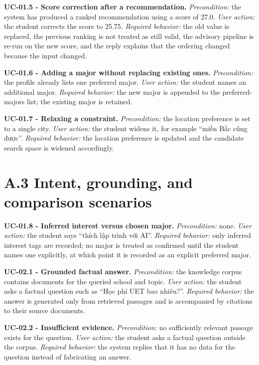 \documentclass[../main.tex]{subfiles}
\begin{document}
\textbf{UC-01.5 - Score correction after a recommendation.}
\textit{Precondition:} the system has produced a ranked recommendation using a score of 27.0.
\textit{User action:} the student corrects the score to 25.75.
\textit{Required behavior:} the old value is replaced, the previous ranking is not treated as still valid, the advisory pipeline is re-run on the new score, and the reply explains that the ordering changed because the input changed.

\textbf{UC-01.6 - Adding a major without replacing existing ones.}
\textit{Precondition:} the profile already lists one preferred major.
\textit{User action:} the student names an additional major.
\textit{Required behavior:} the new major is appended to the preferred-majors list; the existing major is retained.

\textbf{UC-01.7 - Relaxing a constraint.}
\textit{Precondition:} the location preference is set to a single city.
\textit{User action:} the student widens it, for example ``miền Bắc cũng được''.
\textit{Required behavior:} the location preference is updated and the candidate search space is widened accordingly.

\section*{A.3 Intent, grounding, and comparison scenarios}

\textbf{UC-01.8 - Inferred interest versus chosen major.}
\textit{Precondition:} none.
\textit{User action:} the student says ``thích lập trình với AI''.
\textit{Required behavior:} only inferred interest tags are recorded; no major is treated as confirmed until the student names one explicitly, at which point it is recorded as an explicit preferred major.

\textbf{UC-02.1 - Grounded factual answer.}
\textit{Precondition:} the knowledge corpus contains documents for the queried school and topic.
\textit{User action:} the student asks a factual question such as ``Học phí UET bao nhiêu?''.
\textit{Required behavior:} the answer is generated only from retrieved passages and is accompanied by citations to their source documents.

\textbf{UC-02.2 - Insufficient evidence.}
\textit{Precondition:} no sufficiently relevant passage exists for the question.
\textit{User action:} the student asks a factual question outside the corpus.
\textit{Required behavior:} the system replies that it has no data for the question instead of fabricating an answer.
\end{document}
